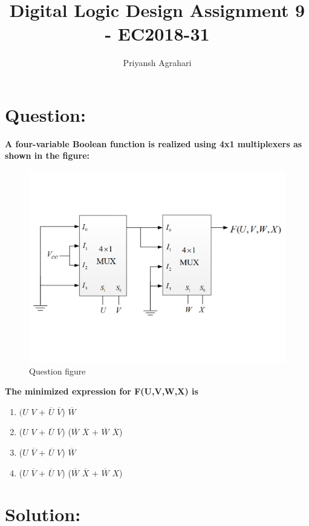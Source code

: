 \documentclass{article}
\title{Digital Logic Design Assignment 9 - EC2018-31}
\author{Priyansh Agrahari}
\begin{document}
\maketitle

\section{Question:}

\textbf{A four-variable Boolean function is realized using 4x1 multiplexers as shown in the figure:}

\begin{figure}[h]
\centering
\includegraphics[scale=0.3]{images/mux_fig.png}
\caption{Question figure}
\label{mux_fig}
\end{figure}

\textbf{The minimized expression for F(U,V,W,X) is}

\begin{enumerate}[label=(\Alph*)]
\item $(U$ $V$ + $\overline{U}$  $\overline{V}$) $\overline{W}$
\item ($U$ $V$ + $\overline{U}$ $\overline{V}$) ($\overline{W}$  $\overline{X}$ + $\overline{W}$ $\overline{X}$)
\item ($U$ $\overline{V}$ + $\overline{U}$ $V$) $\overline{W}$
\item ($U$ $\overline{V}$ + $\overline{U}$ $V$) ($\overline{W}$ $\overline{X}$ + $\overline{W}$ $X$)
\end{enumerate}

\section{Solution:}
\end{document}
